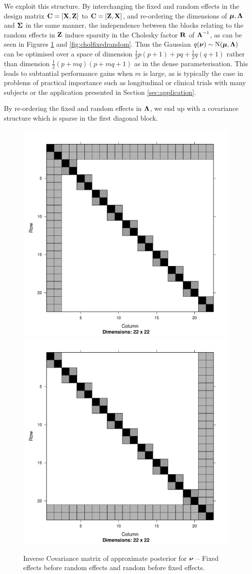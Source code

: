 \noindent We exploit this structure. By interchanging the fixed and random
effects in the design matrix ${\bf C} = [{\bf X}, {\bf Z}]$ to ${\bf C} = [{\bf Z}, {\bf X}]$, and
re-ordering the dimensions of ${\boldsymbol \mu}, {\boldsymbol \Lambda}$ and ${\boldsymbol \Sigma}$ in the same
manner, the independence between the blocks relating to the random effects in
${\bf Z}$ induce sparsity in the Cholesky factor ${\bf R}$ of ${\boldsymbol \Lambda}^{-1}$, as can
be seen in Figures \ref{fig:covfixedrandom} and \ref{fig:cholfixedrandom}. Thus
the Gaussian $q({\boldsymbol \nu}) \sim \text{N}({\boldsymbol \mu}, {\boldsymbol \Lambda})$ can be optimised over a space of
dimension $\frac{1}{2} p (p + 1) + pq + \frac{1}{2} q (q + 1)$ rather than
dimension $\frac{1}{2} (p + mq) (p + mq + 1)$ as in the dense parameterisation.
This leads to subtantial performance gains when $m$ is large, as is typically
the case in problems of practical importance such as longitudinal or clinical
trials with many subjects or the application presented in Section
\ref{sec:application}.
		
By re-ordering the fixed and random effects in ${\boldsymbol \Lambda}$, we end up with a
covariance structure which is sparse in the first diagonal block.

\begin{figure}[h!]
	\includegraphics[width=0.45 \textwidth]{mX_mZ_mLambda.pdf}
	\includegraphics[width=0.45 \textwidth]{mZ_mX_mLambda.pdf}
	\caption{Inverse Covariance matrix of approximate posterior for ${\boldsymbol \nu}$ -- Fixed effects before random effects
						and random before fixed effects.}
	\label{fig:covfixedrandom}
\end{figure}
	
